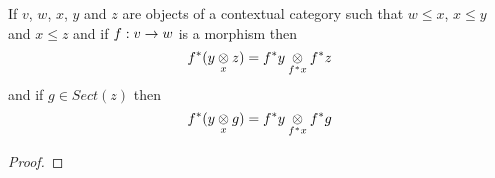 \begin{lemma}
If  $v$, $w$, $x$, $y$ and $z$ are objects of a contextual category \catcw such that
$w \leq x$, $x \leq y$ and $x \leq z$ and if $f: v \morph w$ is a morphism
then
\begin{equation*}
f^*(\crossx{y}{z}{x})=\crossx{f^*y}{f^*z}{f^*x}
\end{equation*}
and if $g \in Sect(z)$ then
\begin{equation*}
f^*(\crossx{y}{g}{x})=\crossx{f^*y}{f^*g}{f^*x}
\end{equation*}
\end{lemma}
\begin{proof}
\tbd 
\end{proof}

